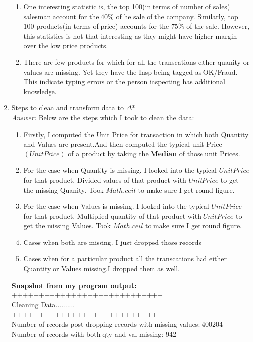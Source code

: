 \documentclass{article}
\begin{document}
\begin{enumerate}
\begin{enumerate}
			\item One interesting statistic is, the top 100(in terms of number of sales) salesman account for the $40\%$ of he sale of the company. Similarly, top 100 products(in terms of price) accounts for the $75\%$ of the sale. However, this statistics is not that interesting as they might have higher margin over the low price products.
			\item There are few products for which for all the transcations either quanity or values are missing. Yet they have the Insp being tagged as OK/Fraud. This indicate typing errors or the person inspecting has additional knowledge.
		\end{enumerate}

		\item Steps to clean and transform data to  $\Delta$*\\
		\emph{Answer:}  Below are the steps which I took to clean the data:
		\begin{enumerate}
			\item Firstly, I computed the Unit Price for transaction in which both Quantity and Values are present.And then computed the typical unit Price $(UnitPrice)$ of a product by taking the \textbf{Median} of those unit Prices.
			\item For the case when Quantity is missing. I looked into the typical $UnitPrice$ for that product. Divided values of that product with  $UnitPrice$ to get the missing Quanity. Took $Math.ceil$ to make sure I get round figure.
			\item For the case when Values is missing. I looked into the typical $UnitPrice$ for that product. Multiplied quantity of that product with  $UnitPrice$ to get the missing Values. Took $Math.ceil$ to make sure I get round figure.
			\item Cases when both are missing. I just dropped those records.
			\item Cases when for a particular product all the transcations had either Quantity or Values missing.I dropped them as well.
		\end{enumerate}
\textbf{Snapshot from my program output:}\\
++++++++++++++++++++++++++++\\
Cleaning Data..........\\
++++++++++++++++++++++++++++\\
Number of records post dropping records with missing values: 400204\\
Number of records with both qty and val missing: 942\\

\end{enumerate}
\end{document}
